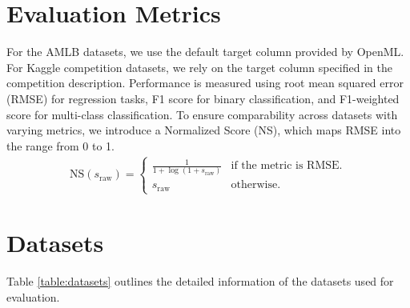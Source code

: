 \newpage
\section{Evaluation Metrics}
\label{app:metric}
For the AMLB datasets, we use the default target column provided by OpenML. For Kaggle competition datasets, we rely on the target column specified in the competition description. Performance is measured using root mean squared error (RMSE) for regression tasks, F1 score for binary classification, and F1-weighted score for multi-class classification. To ensure comparability across datasets with varying metrics, we introduce a Normalized Score (NS), which maps RMSE into the range from 0 to 1.
\begin{align} 
    \text{NS}(s_{\text{raw}}) = \begin{cases} 
        \frac{1}{1 + \log{(1 + s_{\text{raw}})}} & \text{if the metric is RMSE.} \\
        s_{\text{raw}} & \text{otherwise.}
    \end{cases} 
\end{align}

\section{Datasets}
\label{app:dataests}

Table \ref{table:datasets} outlines the detailed information of the datasets used for evaluation.

